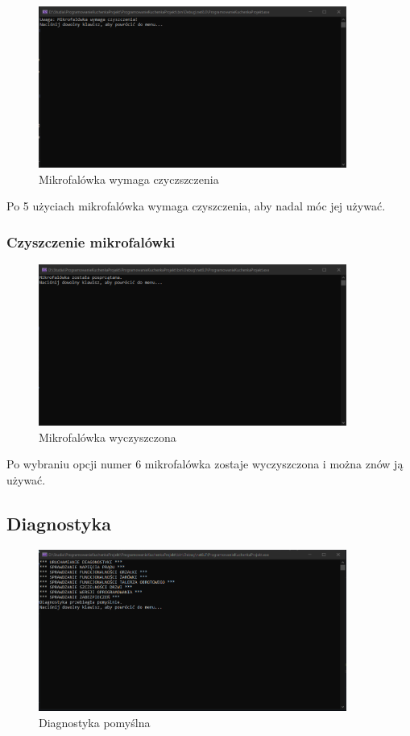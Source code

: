 \begin{figure}[h]
    \centering
    \includegraphics[width=0.9\textwidth]{Menu12.png}
      \caption{Mikrofalówka wymaga czyczszczenia}
    \label{fig:example}
\end{figure}

Po 5 użyciach mikrofalówka wymaga czyszczenia, aby nadal móc jej używać.
\newpage
\subsubsection{Czyszczenie mikrofalówki}

\begin{figure}[h]
    \centering
    \includegraphics[width=0.9\textwidth]{Menu13.png}
      \caption{Mikrofalówka wyczyszczona}
    \label{fig:example}
\end{figure}

Po wybraniu opcji numer 6 mikrofalówka zostaje wyczyszczona i można znów ją używać.

\subsection{Diagnostyka}
\begin{figure}[h]
    \centering
    \includegraphics[width=0.9\textwidth]{Menu14.png}
      \caption{Diagnostyka pomyślna}
    \label{fig:example}
\end{figure}

